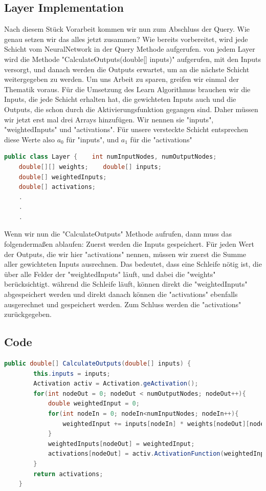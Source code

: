 \documentclass[12pt]{article}
\begin{document}
\subsection{Layer Implementation}
Nach diesem Stück Vorarbeit kommen wir nun zum Abschluss der Query. Wie genau setzen wir das alles jetzt zusammen?
Wie bereits vorbereitet, wird jede Schicht vom NeuralNetwork in der Query Methode aufgerufen. von jedem Layer wird die Methode "CalculateOutputs(double[] inputs)" aufgerufen, mit den Inputs versorgt, und danach werden die Outputs erwartet, um an die nächste Schicht weitergegeben zu werden.
Um uns Arbeit zu sparen, greifen wir einmal der Thematik voraus. Für die Umsetzung des Learn Algorithmus brauchen wir die Inputs, die jede Schicht erhalten hat, die gewichteten Inputs auch und die Outputs, die schon durch die Aktivierungsfunktion gegangen sind. Daher müssen wir jetzt erst mal drei Arrays hinzufügen. Wir nennen sie "inputs", "weightedInputs" und "activations". Für unsere versteckte Schicht entsprechen diese Werte also $a_0$ für "inputs", und $a_1$ für die "activations"
\begin{lstlisting}[language=Java]
public class Layer {    int numInputNodes, numOutputNodes;
    double[][] weights;    double[] inputs;
    double[] weightedInputs;
    double[] activations;
    .
    .
    .
\end{lstlisting}
Wenn wir nun die "CalculateOutputs" Methode aufrufen, dann muss das folgendermaßen ablaufen:
Zuerst werden die Inputs gespeichert.
Für jeden Wert der Outputs, die wir hier "activations" nennen, müssen wir zuerst die Summe aller gewichteten Inputs ausrechnen. Das bedeutet, dass eine Schleife nötig ist, die über alle Felder der "weightedInputs" läuft, und dabei die "weights" berücksichtigt. während die Schleife läuft, können direkt die "weightedInputs" abgespeichert werden und direkt danach können die "activations" ebenfalls ausgerechnet und gespeichert werden. Zum Schluss werden die "activations" zurückgegeben.
\subsection{Code}
\begin{lstlisting}[language=Java]
    public double[] CalculateOutputs(double[] inputs) {
        this.inputs = inputs;
        Activation activ = Activation.geActivation();
        for(int nodeOut = 0; nodeOut < numOutputNodes; nodeOut++){
            double weightedInput = 0;
            for(int nodeIn = 0; nodeIn<numInputNodes; nodeIn++){
                weightedInput += inputs[nodeIn] * weights[nodeOut][nodeIn];
            }
            weightedInputs[nodeOut] = weightedInput;
            activations[nodeOut] = activ.ActivationFunction(weightedInput);
        }
        return activations;
    }
\end{lstlisting}
\end{document}
